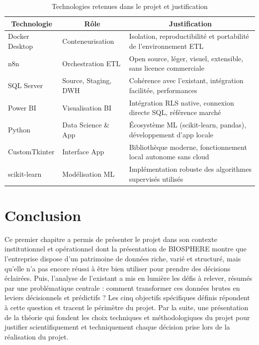 \begin{table}[H]
\centering
\caption{Technologies retenues dans le projet et justification}
\label{tab:ch1:tech}
\begin{tabular}{|p{3cm}|p{4cm}|p{7cm}|}
\hline
\multicolumn{1}{|c|}{\textbf{Technologie}} & 
\multicolumn{1}{c|}{\textbf{Rôle}} & 
\multicolumn{1}{c|}{\textbf{Justification}} \\ \hline
Docker Desktop & Conteneurisation & Isolation, reproductibilité et portabilité de l'environnement ETL \\ \hline
n8n & Orchestration ETL & Open source, léger, visuel, extensible, sans licence commerciale \\ \hline
SQL Server & Source, Staging, DWH & Cohérence avec l'existant, intégration facilitée, performances \\ \hline
Power BI & Visualisation BI & Intégration RLS native, connexion directe SQL, référence marché \\ \hline
Python & Data Science \& App & Écosystème ML (scikit-learn, pandas), développement d'app locale \\ \hline
CustomTkinter & Interface App & Bibliothèque moderne, fonctionnement local autonome sans cloud \\ \hline
scikit-learn & Modélisation ML & Implémentation robuste des algorithmes supervisés utilisés \\ \hline
\end{tabular}
\end{table}

\section{Conclusion}
Ce premier chapitre a permis de présenter le projet dans son contexte institutionnel et opérationnel dont la présentation de BIOSPHERE montre que l'entreprise dispose d'un patrimoine de données riche, varié et structuré, mais qu'elle n'a pas encore réussi à être bien utiliser pour prendre des décisions éclairées. Puis, l’analyse de l'existant a mis en lumière les défis à relever, résumés par une problématique centrale : comment transformer ces données brutes en leviers décisionnels et prédictifs ? Les cinq objectifs spécifiques définis répondent à cette question et tracent le périmètre du projet. Par la suite, une présentation de la théorie qui fondent les choix techniques et méthodologiques du projet pour justifier scientifiquement et techniquement chaque décision prise lors de la réalisation du projet. 

\newpage